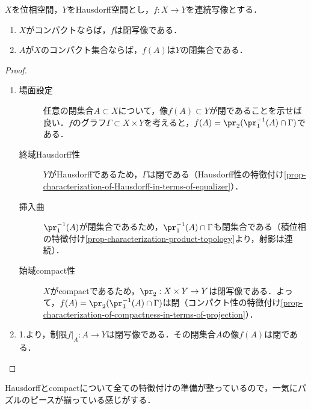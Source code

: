 \documentclass[uplatex,dvipdfmx]{jsreport}
\begin{document}
\begin{proposition}\label{prop-continuous-map-from-compact-to-Hausdorff}
    $X$を位相空間，$Y$をHausdorff空間とし，$f:X\to Y$を連続写像とする．
    \begin{enumerate}
        \item $X$がコンパクトならば，$f$は閉写像である．
        \item $A$が$X$のコンパクト集合ならば，$f(A)$は$Y$の閉集合である．
    \end{enumerate}
\end{proposition}
\begin{proof}\mbox{}
    \begin{enumerate}
        \item \begin{description}
            \item[場面設定] 任意の閉集合$A\subset X$について，像$f(A)\subset Y$が閉であることを示せば良い．$f$のグラフ$\Gamma\subset X\times Y$を考えると，$f(A)=\pr_2(\pr_1^{-1}(A)\cap\Gamma)$である．
            \item[終域Hausdorff性] $Y$がHausdorffであるため，$\Gamma$は閉である（Hausdorff性の特徴付け\ref{prop-characterization-of-Hausdorff-in-terms-of-equalizer}）．
            \item[挿入曲] $\pr_1^{-1}(A)$が閉集合であるため，$\pr_1^{-1}(A)\cap\Gamma$も閉集合である（積位相の特徴付け\ref{prop-characterization-product-topology}より，射影は連続）．
            \item[始域compact性] $X$がcompactであるため，$\pr_2:X\times Y\to Y$は閉写像である．よって，$f(A)=\pr_2(\pr_1^{-1}(A)\cap\Gamma)$は閉（コンパクト性の特徴付け\ref{prop-characterization-of-compactness-in-terms-of-projection}）．
        \end{description}
        \item 
        1.より，制限$f|_A:A\to Y$は閉写像である．その閉集合$A$の像$f(A)$は閉である．
    \end{enumerate}
\end{proof}
\begin{remarks}
    Hausdorffとcompactについて全ての特徴付けの準備が整っているので，一気にパズルのピースが揃っている感じがする．
\end{remarks}
\end{document}

